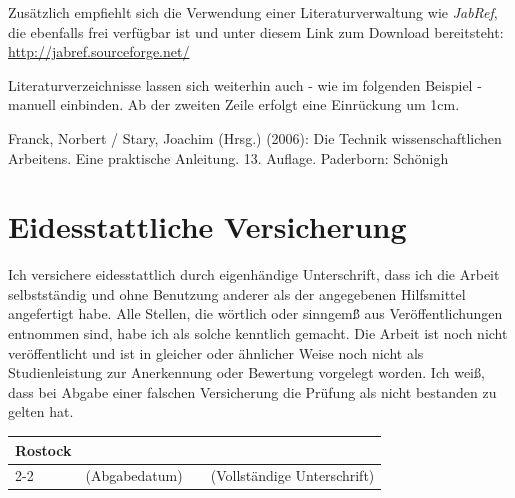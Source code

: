 \documentclass{Vorlage}
\begin{document}
Zus\"atzlich empfiehlt sich die Verwendung einer Literaturverwaltung wie \textit{JabRef}, die ebenfalls frei verf\"ugbar ist und unter diesem Link zum Download bereitsteht: \url{http://jabref.sourceforge.net/}

Literaturverzeichnisse lassen sich weiterhin auch - wie im folgenden Beispiel - manuell einbinden. Ab der zweiten Zeile erfolgt eine Einr\"uckung um 1cm.

\begin{description} %

\item Franck, Norbert / Stary, Joachim (Hrsg.) (2006): Die Technik wissenschaftlichen Arbeitens. Eine praktische Anleitung. 13. Auflage. Paderborn: Sch\"onigh

\end{description}

\newpage

\section{Eidesstattliche Versicherung}

Ich versichere eidesstattlich durch eigenh\"andige Unterschrift, dass ich die Arbeit selbstst\"andig und ohne Benutzung anderer als der angegebenen Hilfsmittel angefertigt habe. Alle Stellen, die w\"ortlich oder sinngem\"\ss{} aus Ver\"offentlichungen entnommen sind, habe ich als solche kenntlich gemacht. Die Arbeit ist noch nicht ver\"offentlicht und ist in gleicher oder \"ahnlicher Weise noch nicht als Studienleistung zur Anerkennung oder Bewertung vorgelegt worden. Ich wei\ss{}, dass bei Abgabe einer falschen Versicherung die Pr\"ufung als nicht bestanden zu gelten hat.

\vspace*{1cm}

\begin{table}[h]
\centering
\begin{tabular}{p{3cm} p{4cm} p{0.5cm} p{6cm}}
Rostock & & &\\[0.5cm]
\cline{2-2} \cline{4-4}
& (Abgabedatum) & & (Vollst\"andige Unterschrift)\\
\end{tabular}
\end{table}
\end{document}
